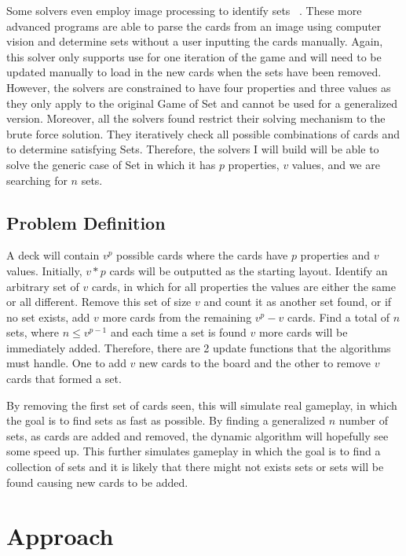 \documentclass[pageno]{jpaper}
\begin{document}
Some solvers even employ image processing to identify sets ~\cite{jorquera}. These more advanced programs are able to parse the cards from an image using computer vision and determine sets without a user inputting the cards manually. Again, this solver only supports use for one iteration of the game and will need to be updated manually to load in the new cards when the sets have been removed. However, the solvers are constrained to have four properties and three values as they only apply to the original Game of Set and cannot be used for a generalized version. Moreover, all the solvers found restrict their solving mechanism to the brute force solution. They iteratively check all possible combinations of cards and to determine satisfying Sets. Therefore, the solvers I will build will be able to solve the generic case of Set in which it has $p$ properties, $v$ values, and we are searching for $n$ sets. 


\subsection{Problem Definition}

A deck will contain $v^p$ possible cards where the cards have $p$ properties and $v$ values. Initially, $v*p$ cards will be outputted as the starting layout. Identify an arbitrary set of $v$ cards, in which for all properties the values are either the same or all different. Remove this set of size $v$ and count it as another set found, or if no set exists, add $v$ more cards from the remaining $v^p - v$ cards. Find a total of $n$ sets, where $n \leq v^{p-1}$ and each time a set is found $v$ more cards will be immediately added. Therefore, there are 2 update functions that the algorithms must handle. One to add $v$ new cards to the board and the other to remove $v$ cards that formed a set. 

By removing the first set of cards seen, this will simulate real gameplay, in which the goal is to find sets as fast as possible. By finding a generalized $n$ number of sets, as cards are added and removed, the dynamic algorithm will hopefully see some speed up. This further simulates gameplay in which the goal is to find a collection of sets and it is likely that there might not exists sets or sets will be found causing new cards to be added. 

\section{Approach}
\end{document}
